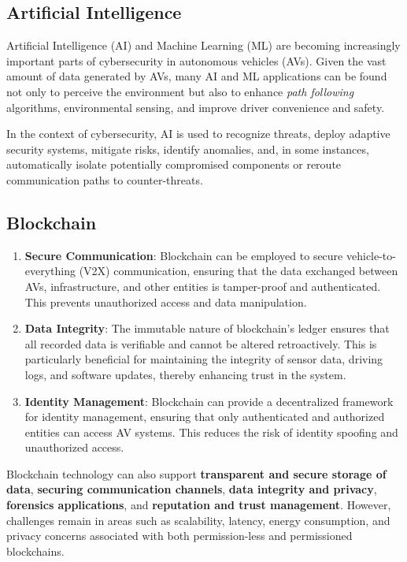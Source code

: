 \subsection{Artificial Intelligence}\label{subsec:artificial-intelligence}
Artificial Intelligence (AI) and Machine Learning (ML)
are becoming increasingly important parts of cybersecurity in autonomous vehicles (AVs).
Given the vast amount of data generated by AVs,
many AI and ML applications can be found not only to perceive the environment
but also to enhance \textit{path following} algorithms, environmental sensing,
and improve driver convenience and safety\cite{giannaros2023autonomous}.

In the context of cybersecurity, AI is used to recognize threats,
deploy adaptive security systems, mitigate risks, identify anomalies,
and, in some instances,
automatically isolate potentially compromised components
or reroute communication paths to counter-threats\cite{durlik2022cybersecurity}.

\subsection{Blockchain}\label{subsec:blockchain}

\begin{enumerate}
    \item \textbf{Secure Communication}: Blockchain can be employed to secure vehicle-to-everything (V2X) communication,
    ensuring that the data exchanged between AVs, infrastructure, and other entities is tamper-proof and authenticated.
    This prevents unauthorized access and data manipulation.
    \item \textbf{Data Integrity}: The immutable nature of blockchain’s ledger ensures that all recorded data is verifiable
    and cannot be altered retroactively.
    This is particularly beneficial for maintaining the integrity of sensor data, driving logs, and software updates,
    thereby enhancing trust in the system.
    \item \textbf{Identity Management}: Blockchain can provide a decentralized framework for identity management,
    ensuring that only authenticated and authorized entities can access AV systems.
    This reduces the risk of identity spoofing and unauthorized access.
\end{enumerate}

Blockchain technology can also support \textbf{transparent and secure storage of data},
\textbf{securing communication channels}, \textbf{data integrity and privacy},
\textbf{forensics applications}, and \textbf{reputation and trust management}.
However, challenges remain in areas such as scalability, latency, energy consumption,
and privacy concerns
associated with both permission-less and permissioned blockchains\cite{bendiab2023autonomous, giannaros2023autonomous, khan2020cyber, admass2023cyber, ahmad2023machine}.

